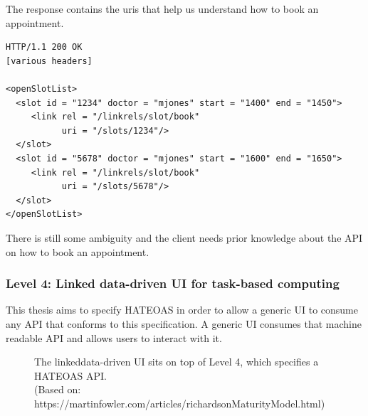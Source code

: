 The response contains the \gls{uri}s that help us understand how to book an appointment.

\lstset{language=XML}
\begin{lstlisting}[caption=Level 3: The response contains information that helps us book an appointment. \citep{richardsonmaturitymodel}]
HTTP/1.1 200 OK
[various headers]

<openSlotList>
  <slot id = "1234" doctor = "mjones" start = "1400" end = "1450">
     <link rel = "/linkrels/slot/book"
           uri = "/slots/1234"/>
  </slot>
  <slot id = "5678" doctor = "mjones" start = "1600" end = "1650">
     <link rel = "/linkrels/slot/book"
           uri = "/slots/5678"/>
  </slot>
</openSlotList>
\end{lstlisting}

There is still some ambiguity and the client needs prior knowledge about the API on how to book an appointment.

\subsubsection{Level 4: Linked data-driven UI for task-based computing}
This thesis aims to specify HATEOAS in order to allow a generic UI to consume any API that conforms to this specification. A generic UI consumes that machine readable API and allows users to interact with it.

\begin{figure}[!htb]
  \caption{The \gls{linkeddata}-driven UI sits on top of Level 4, which specifies a HATEOAS API. \\ (Based on: https://martinfowler.com/articles/richardsonMaturityModel.html)}
\end{figure}

